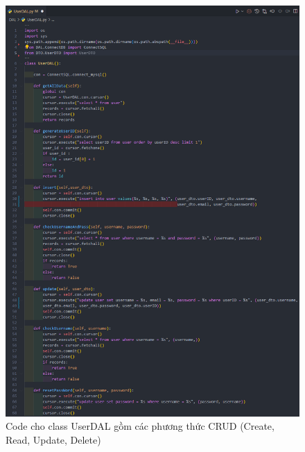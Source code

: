 \documentclass[a4paper]{article}
\begin{document}
\newpage
\begin{figure}[h]
	\centering
	\includegraphics[width=\textwidth]{userDAL.png}
	\caption{Code cho class UserDAL gồm các phương thức CRUD (Create, Read, Update, Delete)}
\end{figure}
\clearpage
\newpage
\end{document}
